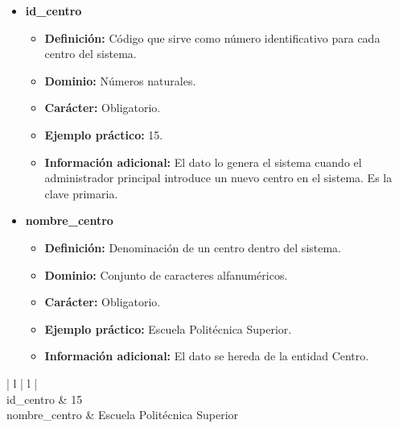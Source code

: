 \begin{description}
   \begin{itemize}
    \item \textbf{id\_centro}
      \begin{itemize}
         \item \textbf{Definición:} Código que sirve como número identificativo
               para cada centro del sistema.
         \item \textbf{Dominio:} Números naturales.
         \item \textbf{Carácter:} Obligatorio.
         \item \textbf{Ejemplo práctico:} 15.
         \item \textbf{Información adicional:} El dato lo genera el sistema
               cuando el administrador principal introduce un nuevo centro en
               el sistema. Es la clave primaria.
      \end{itemize}
   \item \textbf{nombre\_centro}
      \begin{itemize}
         \item \textbf{Definición:} Denominación de un centro dentro del sistema.
         \item \textbf{Dominio:} Conjunto de caracteres alfanuméricos.
         \item \textbf{Carácter:} Obligatorio.
         \item \textbf{Ejemplo práctico:} Escuela Politécnica Superior.
         \item \textbf{Información adicional:} El dato se hereda de la entidad
               Centro.
      \end{itemize}
   \end{itemize}

   \item[Ejemplo práctico]

   \item \begin{center}
            \begin{tabular}{ | l | l | }
            \hline
             \\
            \hline
            id\_centro & 15 \\
            \hline
            nombre\_centro & Escuela Politécnica Superior \\
            \hline
            \end{tabular}
         \end{center}
   \end{description}
